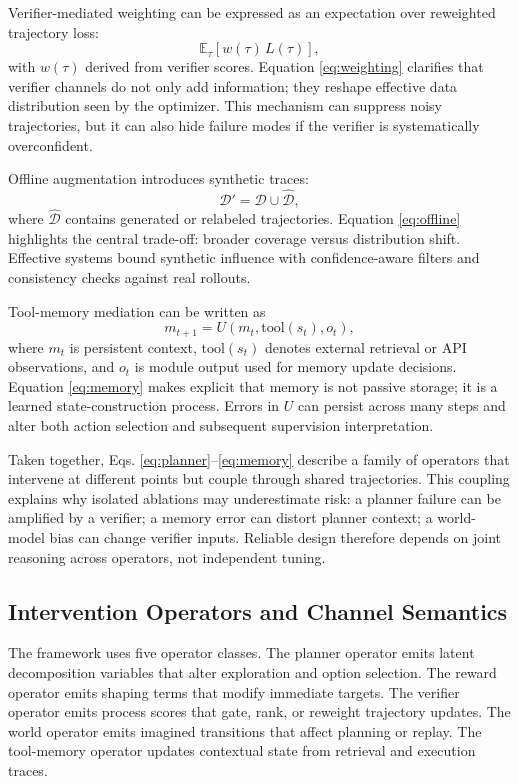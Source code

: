 \documentclass[pdflatex,sn-mathphys-num]{sn-jnl}
\begin{document}
Verifier-mediated weighting can be expressed as an expectation over reweighted trajectory loss:
\begin{equation}
\mathbb{E}_{\tau}\left[w(\tau)\,L(\tau)\right],
\label{eq:weighting}
\end{equation}
with $w(\tau)$ derived from verifier scores. Equation \eqref{eq:weighting} clarifies that verifier channels do not only add information; they reshape effective data distribution seen by the optimizer. This mechanism can suppress noisy trajectories, but it can also hide failure modes if the verifier is systematically overconfident.

Offline augmentation introduces synthetic traces:
\begin{equation}
\mathcal{D}'=\mathcal{D}\cup\hat{\mathcal{D}},
\label{eq:offline}
\end{equation}
where $\hat{\mathcal{D}}$ contains generated or relabeled trajectories. Equation \eqref{eq:offline} highlights the central trade-off: broader coverage versus distribution shift. Effective systems bound synthetic influence with confidence-aware filters and consistency checks against real rollouts.

Tool-memory mediation can be written as
\begin{equation}
m_{t+1}=U\!\left(m_t,\mathrm{tool}(s_t),o_t\right),
\label{eq:memory}
\end{equation}
where $m_t$ is persistent context, $\mathrm{tool}(s_t)$ denotes external retrieval or API observations, and $o_t$ is module output used for memory update decisions. Equation \eqref{eq:memory} makes explicit that memory is not passive storage; it is a learned state-construction process. Errors in $U$ can persist across many steps and alter both action selection and subsequent supervision interpretation.

Taken together, Eqs. \eqref{eq:planner}--\eqref{eq:memory} describe a family of operators that intervene at different points but couple through shared trajectories. This coupling explains why isolated ablations may underestimate risk: a planner failure can be amplified by a verifier; a memory error can distort planner context; a world-model bias can change verifier inputs. Reliable design therefore depends on joint reasoning across operators, not independent tuning.

\subsection{Intervention Operators and Channel Semantics}
The framework uses five operator classes. The planner operator emits latent decomposition variables that alter exploration and option selection. The reward operator emits shaping terms that modify immediate targets. The verifier operator emits process scores that gate, rank, or reweight trajectory updates. The world operator emits imagined transitions that affect planning or replay. The tool-memory operator updates contextual state from retrieval and execution traces.
\end{document}
